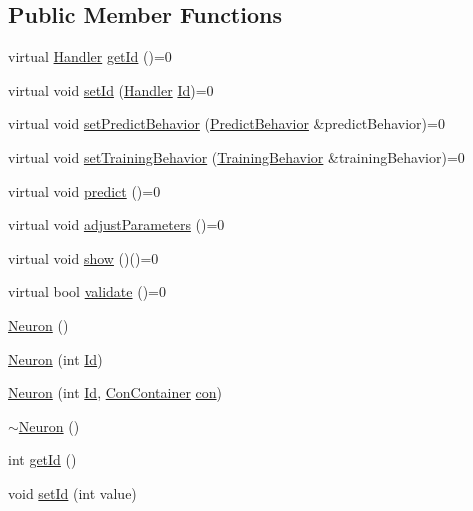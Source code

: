 \subsection*{Public Member Functions}
\begin{DoxyCompactItemize}
\item 
virtual \hyperlink{_a_m_o_r_e_8h_abc871abb71cff6655b8172ee7240b8ef}{Handler} \hyperlink{class_neuron_a33467fa5a6ed662976ac8c745acfb275}{getId} ()=0
\item 
virtual void \hyperlink{class_neuron_ae58936b5582b9da04596a9c29fbace98}{setId} (\hyperlink{_a_m_o_r_e_8h_abc871abb71cff6655b8172ee7240b8ef}{Handler} \hyperlink{class_neuron_a72bb327a7c5c865e6748a4e074ce0680}{Id})=0
\item 
virtual void \hyperlink{class_neuron_a9156cdf9561b7d69fc49d1c1733e078b}{setPredictBehavior} (\hyperlink{class_predict_behavior}{PredictBehavior} \&predictBehavior)=0
\item 
virtual void \hyperlink{class_neuron_a536c2a29eba7649db1b3f872017a550c}{setTrainingBehavior} (\hyperlink{class_training_behavior}{TrainingBehavior} \&trainingBehavior)=0
\item 
virtual void \hyperlink{class_neuron_a7181d8d0a5f9b0e4ff39410785f087e9}{predict} ()=0
\item 
virtual void \hyperlink{class_neuron_acd0bd3149386b9448e85c698f1847366}{adjustParameters} ()=0
\item 
virtual void \hyperlink{class_neuron_a8eefdb3d7b0cf6c42d79ed83d94a7c3c}{show} ()()=0
\item 
virtual bool \hyperlink{class_neuron_a2953fb8e98aea1c74c4f796412644e11}{validate} ()=0
\item 
\hyperlink{class_neuron_a823487d01615fadb8ac19a2768dd9d96}{Neuron} ()
\item 
\hyperlink{class_neuron_a05698a11ac18b6cee34d18f63681ddcc}{Neuron} (int \hyperlink{class_neuron_a72bb327a7c5c865e6748a4e074ce0680}{Id})
\item 
\hyperlink{class_neuron_acc10f105d08a2303a0282bbafa03b032}{Neuron} (int \hyperlink{class_neuron_a72bb327a7c5c865e6748a4e074ce0680}{Id}, \hyperlink{class_con_container}{ConContainer} \hyperlink{class_neuron_a1e92229eb19c3f322e118bdf23b9844e}{con})
\item 
\hyperlink{class_neuron_a94a250ce7e167760e593979b899745b1}{$\sim$Neuron} ()
\item 
int \hyperlink{class_neuron_ad9211d55ea50ad6dfbd2676b9e2335e4}{getId} ()
\item 
void \hyperlink{class_neuron_aa93290c13b40c5b07d92f272a0a2ce63}{setId} (int value)

\end{DoxyCompactItemize}
